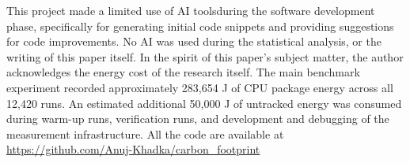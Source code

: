 This project made a limited use of AI toolsduring the software development phase, specifically for generating initial code snippets and providing suggestions for code improvements. No AI was used during the statistical analysis, or the writing of this paper itself.
In the spirit of this paper's subject matter, the author acknowledges the energy cost of the research itself. The main benchmark experiment recorded approximately 283,654 J of CPU package energy across all 12,420 runs. An estimated additional 50,000 J of untracked energy was consumed during warm-up runs, verification runs, and development and debugging of the measurement infrastructure.
All the code are available at \url{https://github.com/Anuj-Khadka/carbon_footprint}